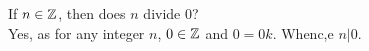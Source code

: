 \guard



\begin{exmp}
\label{exmp:everyIntegerDivides0}
  If $n\in\mathbb{Z}$, then does $n$ divide $0$?\\
  Yes, as for any integer $n$, $0\in\mathbb{Z}$ and $0=0k$.
  Whenc,e $n\vert 0$.
\end{exmp}
